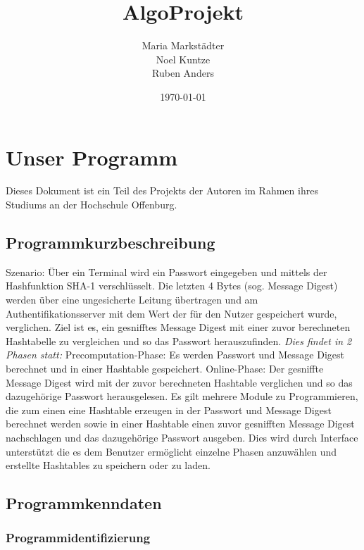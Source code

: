 \documentclass[11pt]{article}
\title{\textbf{AlgoProjekt}}
\author{Maria Markstädter\\
                Noel Kuntze\\
                Ruben Anders\\}
\date{\today}
\begin{document}
 

\maketitle
 
\tableofcontents
  \section{Unser Programm}
Dieses Dokument ist ein Teil des Projekts der Autoren im Rahmen ihres Studiums an der Hochschule Offenburg.
  \subsection{Programmkurzbeschreibung}
  Szenario:
Über ein Terminal wird ein Passwort eingegeben und  mittels der Hashfunktion SHA-1 verschlüsselt. Die letzten 4 Bytes (sog. Message Digest) werden über eine ungesicherte Leitung übertragen und am Authentifikationsserver mit dem Wert der für den Nutzer gespeichert wurde, verglichen. \newline 
Ziel ist es, ein gesnifftes Message Digest mit einer zuvor berechneten Hashtabelle zu vergleichen und so das Passwort herauszufinden.\vspace{2px}   \newline 
{\itshape{Dies findet in 2 Phasen statt:}} \vspace{2px}   \newline
Precomputation-Phase: Es werden Passwort und Message Digest berechnet und in einer Hashtable gespeichert.\vspace{2px} \newline 
Online-Phase: Der gesniffte Message Digest wird mit der zuvor berechneten Hashtable verglichen und so das dazugehörige Passwort herausgelesen. 
Es gilt mehrere Module zu Programmieren, die zum einen eine Hashtable erzeugen in der Passwort und Message Digest berechnet werden sowie in einer Hashtable einen zuvor gesnifften Message Digest nachschlagen und das dazugehörige Passwort ausgeben. Dies wird durch Interface unterstützt die es dem Benutzer ermöglicht einzelne Phasen anzuwählen und erstellte Hashtables zu speichern oder zu laden.

  \subsection{Programmkenndaten}
  \subsubsection{Programmidentifizierung}
\end{document}

